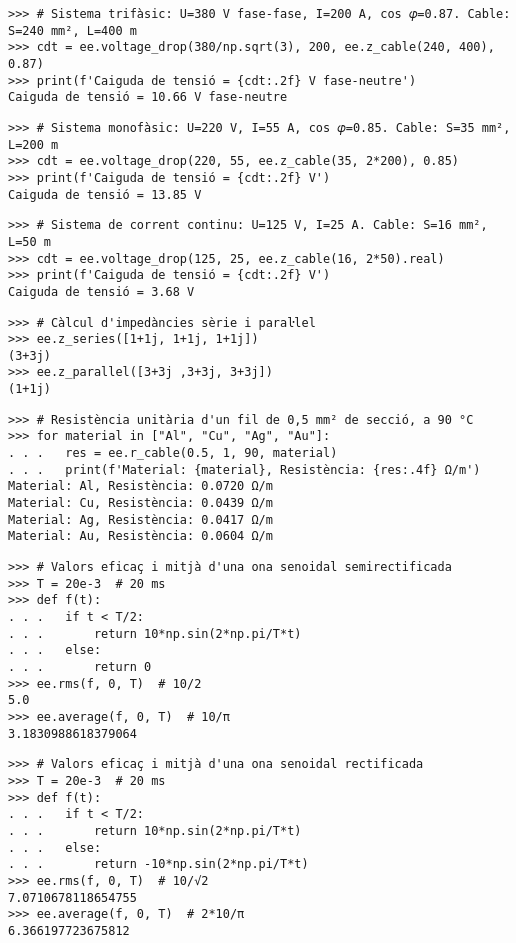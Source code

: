 \begin{lstlisting}
>>> # Sistema trifàsic: U=380 V fase-fase, I=200 A, cos 𝜑=0.87. Cable: S=240 mm², L=400 m
>>> cdt = ee.voltage_drop(380/np.sqrt(3), 200, ee.z_cable(240, 400), 0.87)
>>> print(f'Caiguda de tensió = {cdt:.2f} V fase-neutre')
Caiguda de tensió = 10.66 V fase-neutre
\end{lstlisting}

\begin{lstlisting}
>>> # Sistema monofàsic: U=220 V, I=55 A, cos 𝜑=0.85. Cable: S=35 mm², L=200 m
>>> cdt = ee.voltage_drop(220, 55, ee.z_cable(35, 2*200), 0.85)
>>> print(f'Caiguda de tensió = {cdt:.2f} V')
Caiguda de tensió = 13.85 V
\end{lstlisting}

\begin{lstlisting}
>>> # Sistema de corrent continu: U=125 V, I=25 A. Cable: S=16 mm², L=50 m
>>> cdt = ee.voltage_drop(125, 25, ee.z_cable(16, 2*50).real)
>>> print(f'Caiguda de tensió = {cdt:.2f} V')
Caiguda de tensió = 3.68 V
\end{lstlisting}

\begin{lstlisting}
>>> # Càlcul d'impedàncies sèrie i paraŀlel
>>> ee.z_series([1+1j, 1+1j, 1+1j])
(3+3j)
>>> ee.z_parallel([3+3j ,3+3j, 3+3j])
(1+1j)
\end{lstlisting}

\begin{lstlisting}
>>> # Resistència unitària d'un fil de 0,5 mm² de secció, a 90 °C 
>>> for material in ["Al", "Cu", "Ag", "Au"]:
. . .   res = ee.r_cable(0.5, 1, 90, material)
. . .   print(f'Material: {material}, Resistència: {res:.4f} Ω/m')
Material: Al, Resistència: 0.0720 Ω/m
Material: Cu, Resistència: 0.0439 Ω/m
Material: Ag, Resistència: 0.0417 Ω/m
Material: Au, Resistència: 0.0604 Ω/m        
\end{lstlisting}

\begin{lstlisting}
>>> # Valors eficaç i mitjà d'una ona senoidal semirectificada
>>> T = 20e-3  # 20 ms
>>> def f(t):
. . .   if t < T/2:
. . .       return 10*np.sin(2*np.pi/T*t)
. . .   else:
. . .       return 0
>>> ee.rms(f, 0, T)  # 10/2
5.0
>>> ee.average(f, 0, T)  # 10/π
3.1830988618379064
\end{lstlisting}

\begin{lstlisting}
>>> # Valors eficaç i mitjà d'una ona senoidal rectificada
>>> T = 20e-3  # 20 ms
>>> def f(t):
. . .   if t < T/2:
. . .       return 10*np.sin(2*np.pi/T*t)
. . .   else:
. . .       return -10*np.sin(2*np.pi/T*t)
>>> ee.rms(f, 0, T)  # 10/√2
7.0710678118654755
>>> ee.average(f, 0, T)  # 2*10/π
6.366197723675812
\end{lstlisting}

